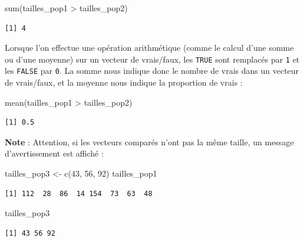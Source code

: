 \documentclass[
  a4paper,
  DIV=11,
  numbers=noendperiod,
  oneside]{scrreprt}
\newenvironment{Shaded}{}{}
\newcommand{\DecValTok}[1]{\textcolor[rgb]{0.00,0.36,0.77}{#1}}
\newcommand{\FunctionTok}[1]{\textcolor[rgb]{0.44,0.26,0.76}{#1}}
\newcommand{\NormalTok}[1]{\textcolor[rgb]{0.14,0.16,0.18}{#1}}
\newcommand{\OtherTok}[1]{\textcolor[rgb]{0.44,0.26,0.76}{#1}}
\newcommand{\SpecialCharTok}[1]{\textcolor[rgb]{0.00,0.36,0.77}{#1}}
\begin{document}
\begin{Shaded}
\begin{Highlighting}[]
\FunctionTok{sum}\NormalTok{(tailles\_pop1 }\SpecialCharTok{\textgreater{}}\NormalTok{ tailles\_pop2)}
\end{Highlighting}
\end{Shaded}

\begin{verbatim}
[1] 4
\end{verbatim}

Lorsque l'on effectue une opération arithmétique (comme le calcul d'une
somme ou d'une moyenne) sur un vecteur de vrais/faux, les \texttt{TRUE}
sont remplacés par \texttt{1} et les \texttt{FALSE} par \texttt{0}. La
somme nous indique donc le nombre de vrais dans un vecteur de
vrais/faux, et la moyenne nous indique la proportion de vrais :

\begin{Shaded}
\begin{Highlighting}[]
\FunctionTok{mean}\NormalTok{(tailles\_pop1 }\SpecialCharTok{\textgreater{}}\NormalTok{ tailles\_pop2)}
\end{Highlighting}
\end{Shaded}

\begin{verbatim}
[1] 0.5
\end{verbatim}

\textbf{Note} : Attention, si les vecteurs comparés n'ont pas la même
taille, un message d'avertissement est affiché :

\begin{Shaded}
\begin{Highlighting}[]
\NormalTok{tailles\_pop3 }\OtherTok{\textless{}{-}} \FunctionTok{c}\NormalTok{(}\DecValTok{43}\NormalTok{, }\DecValTok{56}\NormalTok{, }\DecValTok{92}\NormalTok{)}
\NormalTok{tailles\_pop1}
\end{Highlighting}
\end{Shaded}

\begin{verbatim}
[1] 112  28  86  14 154  73  63  48
\end{verbatim}

\begin{Shaded}
\begin{Highlighting}[]
\NormalTok{tailles\_pop3}
\end{Highlighting}
\end{Shaded}

\begin{verbatim}
[1] 43 56 92
\end{verbatim}
\end{document}

